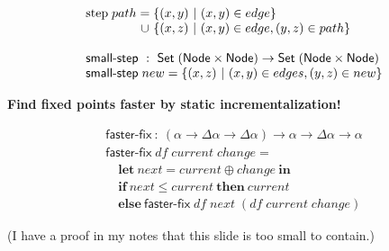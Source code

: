 \documentclass{beamer}
\newcommand{\ms}{\mathsf}
\newcommand{\mb}{\mathbf}
\newcommand{\x}{\times}
\newcommand{\setfor}[2]{\{#1 ~|~ #2\}}
\begin{document}
\begin{frame}

  \pause
  \large
  \[\begin{array}{l}
    \text{step}\; path =
    \setfor{(x,y)}{(x,y) \in edge}\\
    \phantom{\text{step}\;path} \hspace{1.15pt}\cup\hspace{1.15pt}
    \setfor{(x,z)}{(x,y) \in edge, (y,z) \in path}\\
    \\
    \textsf{small-step} ~:~ \ms{Set}\;(\ms{Node} \x \ms{Node})
    \to \ms{Set}\;(\ms{Node} \x \ms{Node})\\
    \textsf{small-step} \; new =
    \setfor{(x,z)}{(x,y) \in edges, (y,z) \in new}\\
  \end{array}\]
  \vspace{0cm}

  \pause
  \huge\bf Find fixed points faster by static incrementalization!
\end{frame}


\begin{frame}
  \large
  \[\begin{array}{l}
  \textsf{faster-fix} ~:~ (\alpha \to \Delta \alpha \to \Delta \alpha)
  \to \alpha \to \Delta \alpha \to \alpha\\
  \textsf{faster-fix} \; df \; current \; change =\\
  \quad \mb{let}~ next = current \oplus change ~\mb{in}\\
  \quad \mb{if}~ next \le current ~\mb{then}~ current\\
  \quad \mb{else}~ \textsf{faster-fix} \; df \; next \; (df \; current \; change)
  \end{array}\]



  \vspace{0.5cm}

  \small (I have a proof in my notes that
  this slide is too small to contain.)
\end{frame}
\end{document}
